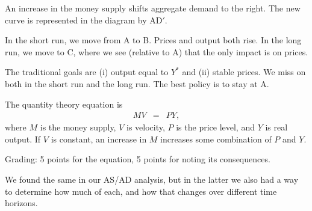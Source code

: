 \documentclass[letterpaper,12pt]{exam}
\begin{document}
\begin{questions}
\begin{solution}
\begin{center}
\begin{picture}
\end{picture}
\end{center}


\begin{parts}
\item An increase in the money supply shifts aggregate demand to the right.
The new curve is represented in the diagram by AD$'$.

\item In the short run, we move from A to B.  Prices and output both rise.
In the long run, we move to C, where we see (relative to A) that the only impact is on prices.

\item The traditional goals are (i) output equal to $Y^*$ and
(ii) stable prices.
We miss on both in the short run and the long run.
The best policy is to stay at A.

\item The quantity theory equation is
\begin{eqnarray*}
    M V &=& P Y ,
\end{eqnarray*}
where $M$ is the money supply, $V$ is velocity,
$P$ is the price level, and $Y$ is real output.
If $V$ is constant, an increase in $M$ increases some combination
of $P$ and $Y$.

Grading:  5 points for the equation, 5 points for noting its consequences.

\item We found the same in our AS/AD analysis,
but in the latter
we also had a way to determine how much of each,
and how that changes over different time horizons.
\end{parts}
\end{solution}


\end{questions}
\end{document}
